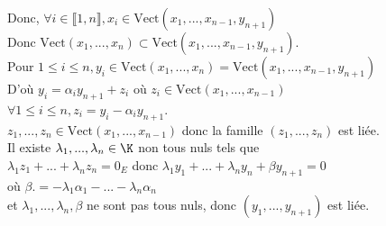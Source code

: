 \documentclass[12pt, a4paper]{report}
\begin{document}
\begin{exemple}[Exercice]{}
Donc, $\forall i \in \llbracket 1,n \rrbracket, x_i \in \text{Vect}(x_1,...,x_{n-1},y_{n+1})$ \\
Donc $\text{Vect}(x_1,...,x_n) \subset \text{Vect}(x_1,...,x_{n-1}, y_{n+1})$. \\
Pour $1 \le i \le n, y_i \in \text{Vect}(x_1,...,x_n) = \text{Vect}(x_1,...,x_{n-1},y_{n+1})$ \\
D'où $y_i = \alpha_i y_{n+1}+z_i$ où $z_i \in \text{Vect}(x_1,...,x_{n-1})$ \\
$\forall 1\le i \le n, z_i = y_i - \alpha_iy_{n+1}$. \\
$z_1,...,z_n \in \text{Vect}(x_1,...,x_{n-1})$ donc la famille $(z_1,...,z_n)$ est liée. \\
Il existe $\lambda_1,...,\lambda_n \in \K$ non tous nuls tels que \\
$\lambda_1z_1+...+\lambda_nz_n = 0_E$ donc $\lambda_1y_1+...+\lambda_ny_n+\beta y_{n+1} = 0$ \\
où $\beta. = -\lambda_1\alpha_1-...-\lambda_n\alpha_n$ \\
et $\lambda_1,...,\lambda_n,\beta$ ne sont pas tous nuls, donc $(y_1,...,y_{n+1})$ est liée.
\end{exemple}
\end{document}
